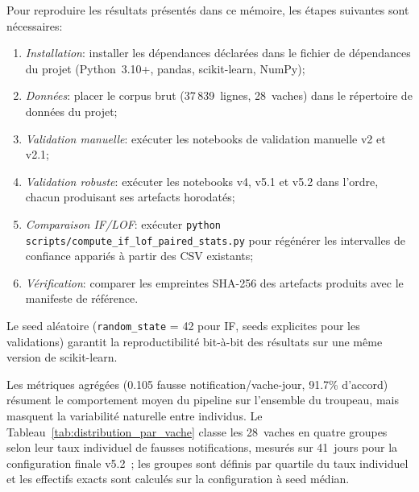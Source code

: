 Pour reproduire les résultats présentés dans ce mémoire, les étapes suivantes sont
nécessaires:

\begin{enumerate}
    \item \textit{Installation}: installer les dépendances déclarées dans le fichier de
    dépendances du projet (Python~3.10+, pandas, scikit-learn, NumPy);
    \item \textit{Données}: placer le corpus brut (37\,839~lignes, 28~vaches) dans le
    répertoire de données du projet;
    \item \textit{Validation manuelle}: exécuter les notebooks de validation manuelle
    v2 et v2.1;
    \item \textit{Validation robuste}: exécuter les notebooks v4, v5.1 et v5.2 dans
    l'ordre, chacun produisant ses artefacts horodatés;
    \item \textit{Comparaison IF/LOF}: exécuter \texttt{python scripts/compute\_if\_lof\_paired\_stats.py}
    pour régénérer les intervalles de confiance appariés à partir des CSV existants;
    \item \textit{Vérification}: comparer les empreintes SHA-256 des artefacts produits
    avec le manifeste de référence.
\end{enumerate}

Le seed aléatoire (\texttt{random\_state} = 42 pour IF, seeds explicites pour les
validations) garantit la reproductibilité bit-à-bit des résultats sur une même version
de scikit-learn.

\label{annexe:variabilite_vache}

Les métriques agrégées (0.105 fausse notification/vache-jour, 91.7\% d'accord) résument
le comportement moyen du pipeline sur l'ensemble du troupeau, mais masquent la variabilité
naturelle entre individus. Le Tableau~\ref{tab:distribution_par_vache} classe les 28~vaches
en quatre groupes selon leur taux individuel de fausses notifications, mesurés sur
41~jours pour la configuration finale v5.2~; les groupes sont définis par quartile du
taux individuel et les effectifs exacts sont calculés sur la configuration à seed
médian.

